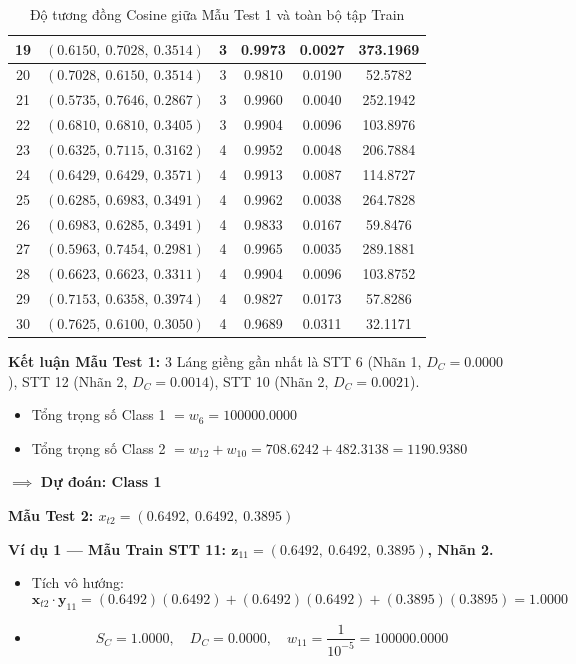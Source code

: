 \documentclass[12pt,a4paper]{article}
\begin{document}
\begin{table}[H]
{\begin{tabular}{|c|c|c|c|c|c|}
19 & $(0.6150,\ 0.7028,\ 0.3514)$ & 3 & 0.9973 & 0.0027 & 373.1969 \\ \hline
20 & $(0.7028,\ 0.6150,\ 0.3514)$ & 3 & 0.9810 & 0.0190 & 52.5782 \\ \hline
21 & $(0.5735,\ 0.7646,\ 0.2867)$ & 3 & 0.9960 & 0.0040 & 252.1942 \\ \hline
22 & $(0.6810,\ 0.6810,\ 0.3405)$ & 3 & 0.9904 & 0.0096 & 103.8976 \\ \hline
23 & $(0.6325,\ 0.7115,\ 0.3162)$ & 4 & 0.9952 & 0.0048 & 206.7884 \\ \hline
24 & $(0.6429,\ 0.6429,\ 0.3571)$ & 4 & 0.9913 & 0.0087 & 114.8727 \\ \hline
25 & $(0.6285,\ 0.6983,\ 0.3491)$ & 4 & 0.9962 & 0.0038 & 264.7828 \\ \hline
26 & $(0.6983,\ 0.6285,\ 0.3491)$ & 4 & 0.9833 & 0.0167 & 59.8476 \\ \hline
27 & $(0.5963,\ 0.7454,\ 0.2981)$ & 4 & 0.9965 & 0.0035 & 289.1881 \\ \hline
28 & $(0.6623,\ 0.6623,\ 0.3311)$ & 4 & 0.9904 & 0.0096 & 103.8752 \\ \hline
29 & $(0.7153,\ 0.6358,\ 0.3974)$ & 4 & 0.9827 & 0.0173 & 57.8286 \\ \hline
30 & $(0.7625,\ 0.6100,\ 0.3050)$ & 4 & 0.9689 & 0.0311 & 32.1171 \\ \hline
\end{tabular}%
}
\caption{Độ tương đồng Cosine giữa Mẫu Test 1 và toàn bộ tập Train}
\end{table}
 
\textbf{Kết luận Mẫu Test 1:} 3 Láng giềng gần nhất là STT 6 (Nhãn 1, $D_C=0.0000$), STT 12 (Nhãn 2, $D_C=0.0014$), STT 10 (Nhãn 2, $D_C=0.0021$).
\begin{itemize}
    \item Tổng trọng số Class 1 $= w_6 = 100000.0000$
    \item Tổng trọng số Class 2 $= w_{12} + w_{10} = 708.6242 + 482.3138 = 1190.9380$
\end{itemize}
$\implies$ \textbf{Dự đoán: Class 1}
 
\vspace{0.5cm}
 
\textbf{Mẫu Test 2: $x_{t2} = (0.6492,\ 0.6492,\ 0.3895)$}
 
\vspace{0.3cm}
\textbf{Ví dụ 1 — Mẫu Train STT 11: $\mathbf{z}_{11} = (0.6492,\ 0.6492,\ 0.3895)$, Nhãn 2.}
\begin{itemize}
    \item Tích vô hướng:
    \[
        \mathbf{x}_{t2} \cdot \mathbf{y}_{11}
        = (0.6492)(0.6492) + (0.6492)(0.6492) + (0.3895)(0.3895) = 1.0000
    \]
    \item
    \[
        S_C = 1.0000, \quad D_C = 0.0000, \quad
        w_{11} = \frac{1}{10^{-5}} = 100000.0000
    \]
\end{itemize}
 
\end{document}
